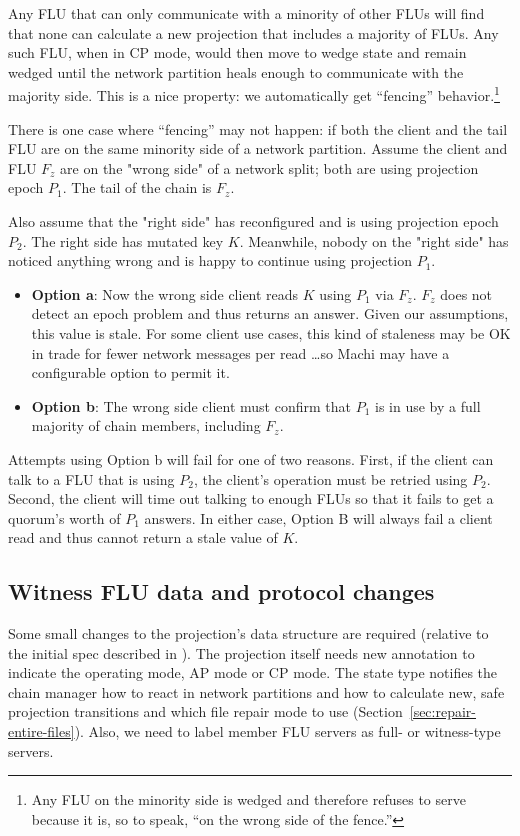 \documentclass[preprint,10pt]{sigplanconf}
\begin{document}
Any FLU that can only communicate with a minority of other FLUs will
find that none can calculate a new projection that includes a
majority of FLUs.  Any such FLU, when in CP mode, would then move to
wedge state and remain wedged until the network partition heals enough
to communicate with the majority side.  This is a nice property: we
automatically get ``fencing'' behavior.\footnote{Any FLU on the minority side
  is wedged and therefore refuses to serve because it is, so to speak,
  ``on the wrong side of the fence.''}

There is one case where ``fencing'' may not happen: if both the client
and the tail FLU are on the same minority side of a network partition.
Assume the client and FLU $F_z$ are on the "wrong side" of a network
split; both are using projection epoch $P_1$.  The tail of the
chain is $F_z$.

Also assume that the "right side" has reconfigured and is using
projection epoch $P_2$.  The right side has mutated key $K$.  Meanwhile,
nobody on the "right side" has noticed anything wrong and is happy to
continue using projection $P_1$.

\begin{itemize}
\item {\bf Option a}: Now the wrong side client reads $K$ using $P_1$ via
  $F_z$.  $F_z$ does not detect an epoch problem and thus returns an
  answer.  Given our assumptions, this value is stale.  For some
  client use cases, this kind of staleness may be OK in trade for
  fewer network messages per read \ldots so Machi may
  have a configurable option to permit it.
\item {\bf Option b}: The wrong side client must confirm that $P_1$ is
  in use by a full majority of chain members, including $F_z$.
\end{itemize}

Attempts using Option b will fail for one of two reasons.  First, if
the client can talk to a FLU that is using $P_2$, the client's
operation must be retried using $P_2$.  Second, the client will time
out talking to enough FLUs so that it fails to get a quorum's worth of
$P_1$ answers.  In either case, Option B will always fail a client
read and thus cannot return a stale value of $K$.

\subsection{Witness FLU data and protocol changes}

Some small changes to the projection's data structure
are required (relative to the initial spec described in
\cite{machi-design}).  The projection itself
needs new annotation to indicate the operating mode, AP mode or CP
mode.  The state type notifies the chain manager how to
react in network partitions and how to calculate new, safe projection
transitions and which file repair mode to use
(Section~\ref{sec:repair-entire-files}).
Also, we need to label member FLU servers as full- or
witness-type servers.
\end{document}
